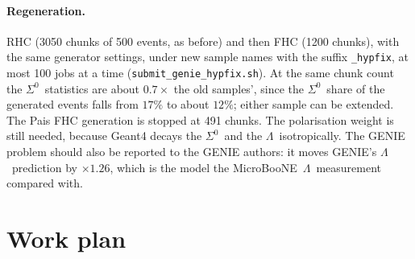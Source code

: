 \documentclass[11pt,a4paper]{article}
\newcommand{\Szero}{\ensuremath{\Sigma^{0}}}
\newcommand{\Lam}{\ensuremath{\Lambda}}
\newcommand{\uboone}{MicroBooNE}
\begin{document}
\paragraph{Regeneration.} RHC (3050 chunks of 500 events, as before) and then FHC (1200
chunks), with the same generator settings, under new sample names with the suffix
\texttt{\_hypfix}, at most 100 jobs at a time (\texttt{submit\_genie\_hypfix.sh}). At the
same chunk count the \Szero\ statistics are about $0.7\times$ the old samples', since the
\Szero\ share of the generated events falls from $17\%$ to about $12\%$; either sample can be
extended. The Pais FHC generation is stopped at 491 chunks. The polarisation weight is still
needed, because Geant4 decays the \Szero\ and the \Lam\ isotropically. The GENIE problem should
also be reported to the GENIE authors: it moves GENIE's \Lam\ prediction by $\times1.26$, which
is the model the \uboone\ \Lam\ measurement compared with.

\section{Work plan}
\label{sec:plan}
\end{document}

